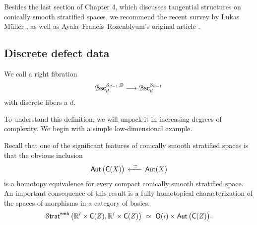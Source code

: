 Besides the last section of Chapter 4, which discusses tangential structures on conically smooth stratified spaces, we recommend the recent survey by Lukas M\"uller \cite{Mu25}, as well as Ayala--Francis--Rozenblyum's original article \cite{AFR2}.


\subsection{Discrete defect data}

\begin{definition}
    We call a right fibration 
    \begin{equation}
        \operatorname{\mathcal B\mathsf{sc}}_{d}^{\mathcal S_{d-1},\mathbb D} \longrightarrow \operatorname{\mathcal B\mathsf{sc}}_{d}^{\mathcal S_{d-1}}
    \end{equation}
    with discrete fibers a $d$.
\end{definition}

\nid To understand this definition, we will unpack it in increasing degrees of complexity. We begin with a simple low-dimensional example.

\begin{observation}
    Recall that one of the significant features of conically smooth stratified spaces is that the obvious inclusion
    \begin{equation}
        \operatorname{\sf Aut}\big(\mathsf C(X)\big) \, \xleftarrow{\,\,\,\simeq\,\,\,} \, \operatorname{\sf Aut}(X)
    \end{equation}
    is a homotopy equivalence for every compact conically smooth stratified space. An important consequence of this result is a fully homotopical characterization of the spaces of morphisms in a category of basics:
    \begin{equation}
        \operatorname{\mathcal S\mathsf{trat}}^{\sf emb}\big(\mathbb R^{i} \times \mathsf C(Z),\mathbb R^{i} \times \mathsf C(Z)\big)\,\, \simeq \,\, \mathsf O(i) \times \operatorname{\sf Aut}\big(\mathsf C(Z)\big).
    \end{equation}
\end{observation}

